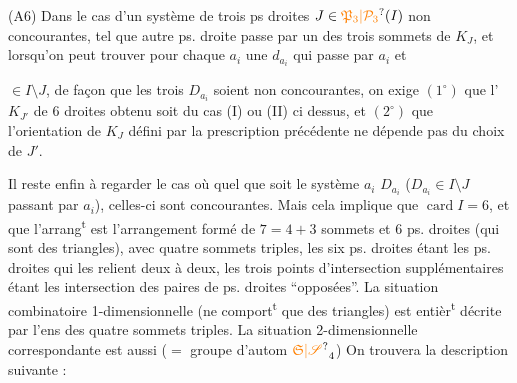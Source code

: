 (A6)  Dans le cas d'un système
de trois ps droites $J\in\unsure{\mathfrak P_3|\mathcal P_3}(I)$ non concourantes,
tel que  autre ps. droite passe par un des
trois sommets  de $K_J$, et lorsqu'on peut trouver
pour chaque $a_i$ une $d_{a_i}$ qui passe par $a_i$ et

 $\in I\setminus J$, de façon que les trois
$D_{a_i}$ soient non concourantes, on exige
$(1^\circ)$ que l' $K_{J'}$ de 6 droites obtenu
soit du cas (I) ou (II) ci dessus, et
$(2^\circ)$ que l'orientation de $K_J$ défini par la
prescription précédente ne dépende pas du
choix de $J'$.

Il reste enfin à regarder le cas où
quel que soit le système $a_i$ $D_{a_i}$ ($D_{a_i}\in I\setminus J$
passant par $a_i$), celles-ci sont concourantes.
Mais cela implique que  $\operatorname{card} I=6$,
et que l'arrang\textsuperscript{t} est  l'arrangement
  formé de $7=4+3$ sommets
et 6 ps. droites (qui sont des triangles),
avec quatre sommets triples, les six ps.
droites étant les ps. droites qui les relient
deux à deux, les trois points d'intersection
supplémentaires étant les intersection des
paires de ps. droites ``opposées''. La situation
combinatoire 1-dimensionnelle (ne comport\textsuperscript{t}
que des triangles) est entièr\textsuperscript{t} décrite
par l'ens des quatre sommets triples.
La situation 2-dimensionnelle correspondante
est aussi  ($=$ groupe d'autom $\unsure{\mathfrak S|\mathscr S}_4$)
On trouvera la description suivante :
